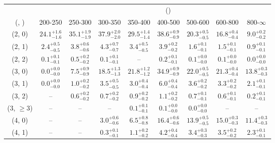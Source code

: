 \begin{table}[h!]
\tiny
\centering
{}
\begin{tabular}
{ccccccccc}
	\hline\hline
&	& \multicolumn{8}{c}{\scalht (\gev)} \\ 
	 (\njet,  \nb) & 200-250 & 250-300 & 300-350 & 350-400 & 400-500 & 500-600 & 600-800 & 800-$\infty$ \\ [0.8ex] 
\hline
	(2, 0) & $24.1^{+ 1.6 }_{- 1.6 }$ & $35.1^{+ 1.9 }_{- 1.9 }$ & $37.9^{+ 2.0 }_{- 2.0 }$ & $29.5^{+ 1.4 }_{- 1.4 }$ & $38.6^{+ 0.9 }_{- 0.9 }$ & $20.3^{+ 0.5 }_{- 0.5 }$ & $16.8^{+ 0.4 }_{- 0.4 }$ & $9.0^{+ 0.2 }_{- 0.2 }$ \\[0.5ex] 
	(2, 1) & $2.4^{+ 0.5 }_{- 0.5 }$ & $3.8^{+ 0.6 }_{- 0.6 }$ & $4.3^{+ 0.7 }_{- 0.7 }$ & $3.4^{+ 0.5 }_{- 0.5 }$ & $3.9^{+ 0.2 }_{- 0.2 }$ & $1.6^{+ 0.1 }_{- 0.1 }$ & $1.5^{+ 0.1 }_{- 0.1 }$ & $0.9^{+ 0.1 }_{- 0.1 }$ \\[0.5ex] 
	(2, 2) & $0.1^{+ 0.1 }_{- 0.1 }$ & $0.5^{+ 0.2 }_{- 0.2 }$ & $0.1^{+ 0.1 }_{- 0.1 }$ & -- & $0.2^{+ 0.1 }_{- 0.1 }$ & $0.1^{+ 0.0 }_{- 0.0 }$ & $0.1^{+ 0.0 }_{- 0.0 }$ & $0.0^{+ 0.0 }_{- 0.0 }$ \\[0.5ex] 
	(3, 0) & $0.0^{+ 0.0 }_{- 0.0 }$ & $7.5^{+ 0.9 }_{- 0.9 }$ & $18.5^{+ 1.3 }_{- 1.3 }$ & $21.8^{+ 1.2 }_{- 1.2 }$ & $34.9^{+ 0.9 }_{- 0.9 }$ & $22.0^{+ 0.5 }_{- 0.5 }$ & $21.3^{+ 0.4 }_{- 0.4 }$ & $13.8^{+ 0.3 }_{- 0.3 }$ \\[0.5ex] 
	(3, 1) & $0.0^{+ 0.0 }_{- 0.0 }$ & $1.0^{+ 0.2 }_{- 0.2 }$ & $3.5^{+ 0.5 }_{- 0.5 }$ & $3.0^{+ 0.4 }_{- 0.4 }$ & $6.0^{+ 0.4 }_{- 0.4 }$ & $3.6^{+ 0.2 }_{- 0.2 }$ & $3.3^{+ 0.2 }_{- 0.2 }$ & $2.1^{+ 0.1 }_{- 0.1 }$ \\[0.5ex] 
	(3, 2) & -- & $0.6^{+ 0.2 }_{- 0.2 }$ & $0.7^{+ 0.2 }_{- 0.2 }$ & $0.9^{+ 0.2 }_{- 0.2 }$ & $1.1^{+ 0.2 }_{- 0.2 }$ & $0.7^{+ 0.1 }_{- 0.1 }$ & $0.6^{+ 0.1 }_{- 0.1 }$ & $0.2^{+ 0.1 }_{- 0.1 }$ \\[0.5ex] 
	(3, $\ge3$) & -- & -- & -- & $0.1^{+ 0.1 }_{- 0.1 }$ & $0.1^{+ 0.0 }_{- 0.0 }$ & $0.0^{+ 0.0 }_{- 0.0 }$ & -- & -- \\[0.5ex] 
	(4, 0) & -- & -- & $3.0^{+ 0.6 }_{- 0.6 }$ & $6.5^{+ 0.8 }_{- 0.8 }$ & $16.4^{+ 0.6 }_{- 0.6 }$ & $13.9^{+ 0.5 }_{- 0.5 }$ & $15.0^{+ 0.3 }_{- 0.3 }$ & $11.4^{+ 0.3 }_{- 0.3 }$ \\[0.5ex] 
	(4, 1) & -- & -- & $0.3^{+ 0.1 }_{- 0.1 }$ & $1.1^{+ 0.2 }_{- 0.2 }$ & $4.2^{+ 0.4 }_{- 0.4 }$ & $3.4^{+ 0.3 }_{- 0.3 }$ & $3.5^{+ 0.2 }_{- 0.2 }$ & $2.3^{+ 0.1 }_{- 0.1 }$ \\[0.5ex] 

\end{tabular}
\end{table}

